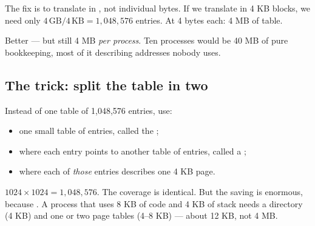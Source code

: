 The fix is to translate in , not individual bytes. If we translate in 4 KB blocks,
we need only $4\,\text{GB} / 4\,\text{KB} = 1{,}048{,}576$ entries. At 4 bytes each: 4 MB of table.

Better --- but still 4 MB \emph{per process}. Ten processes would be 40 MB of pure bookkeeping,
most of it describing addresses nobody uses.

\subsection{The trick: split the table in two}

Instead of one table of 1,048,576 entries, use:

\begin{itemize}
  \item one small table of  entries, called the ;
  \item where each entry points to another table of  entries, called a ;
  \item where each of \emph{those} entries describes one 4 KB page.
\end{itemize}

$1024 \times 1024 = 1{,}048{,}576$. The coverage is identical. But the saving is enormous, because
. A process that uses 8 KB of code and 4 KB of stack needs
a directory (4 KB) and one or two page tables (4--8 KB) --- about 12 KB, not 4 MB.

